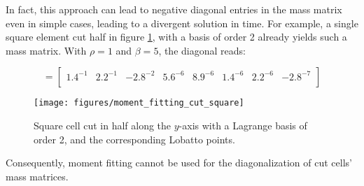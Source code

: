 In fact, this approach can lead to negative diagonal entries in the mass matrix even in simple cases, leading to a divergent solution in time. For example, a single square element cut half in figure \ref{fig:moment_fitting_cut_square}, with a basis of order 2 already yields such a mass matrix. With $\rho=1$ and $\beta=5$, the diagonal reads:

\begin{equation}
		[M_{ii}^e] =
		\begin{bmatrix}
			1.4^{-1} &
			2.2^{-1} &
			-2.8^{-2} &
			5.6^{-6} &
			8.9^{-6} &
			1.4^{-6} &
			2.2^{-6} &
			-2.8^{-7} \\
		\end{bmatrix}
\end{equation}

\begin{figure}[h]
	\centering
	\texttt{[image: figures/moment\_fitting\_cut\_square]}
	\caption{Square cell cut in half along the $y$-axis with a Lagrange basis of order 2, and the corresponding Lobatto points.}
	\label{fig:moment_fitting_cut_square}
\end{figure}

Consequently, moment fitting cannot be used for the diagonalization of cut cells' mass matrices.
